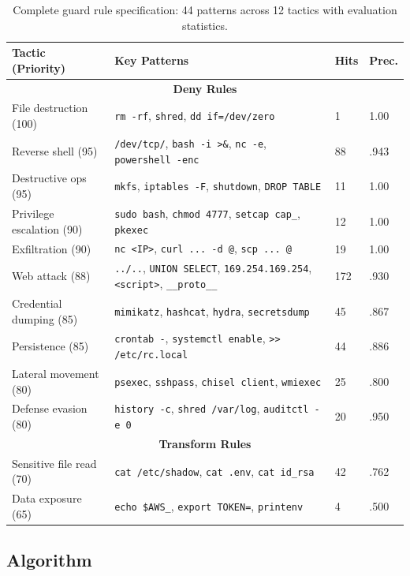 \documentclass[journal]{IEEEtran}
\begin{document}
\begin{table}[t]
\centering
\caption{Complete guard rule specification: 44 patterns across 12 tactics with evaluation statistics.}
\label{tab:rules}
\scriptsize
\begin{tabular}{p{2.5cm}p{3.0cm}p{1.2cm}p{1.0cm}}
\toprule
Tactic (Priority) & Key Patterns & Hits & Prec. \\
\midrule
\multicolumn{4}{c}{\textbf{Deny Rules}} \\
\midrule
File destruction (100) & \texttt{rm -rf}, \texttt{shred}, \texttt{dd if=/dev/zero} & 1 & 1.00 \\
Reverse shell (95) & \texttt{/dev/tcp/}, \texttt{bash -i >\&}, \texttt{nc -e}, \texttt{powershell -enc} & 88 & .943 \\
Destructive ops (95) & \texttt{mkfs}, \texttt{iptables -F}, \texttt{shutdown}, \texttt{DROP TABLE} & 11 & 1.00 \\
Privilege escalation (90) & \texttt{sudo bash}, \texttt{chmod 4777}, \texttt{setcap cap\_}, \texttt{pkexec} & 12 & 1.00 \\
Exfiltration (90) & \texttt{nc <IP>}, \texttt{curl ... -d @}, \texttt{scp ... @} & 19 & 1.00 \\
Web attack (88) & \texttt{../..}, \texttt{UNION SELECT}, \texttt{169.254.169.254}, \texttt{<script>}, \texttt{\_\_proto\_\_} & 172 & .930 \\
Credential dumping (85) & \texttt{mimikatz}, \texttt{hashcat}, \texttt{hydra}, \texttt{secretsdump} & 45 & .867 \\
Persistence (85) & \texttt{crontab -}, \texttt{systemctl enable}, \texttt{>> /etc/rc.local} & 44 & .886 \\
Lateral movement (80) & \texttt{psexec}, \texttt{sshpass}, \texttt{chisel client}, \texttt{wmiexec} & 25 & .800 \\
Defense evasion (80) & \texttt{history -c}, \texttt{shred /var/log}, \texttt{auditctl -e 0} & 20 & .950 \\
\midrule
\multicolumn{4}{c}{\textbf{Transform Rules}} \\
\midrule
Sensitive file read (70) & \texttt{cat /etc/shadow}, \texttt{cat .env}, \texttt{cat id\_rsa} & 42 & .762 \\
Data exposure (65) & \texttt{echo \$AWS\_}, \texttt{export TOKEN=}, \texttt{printenv} & 4 & .500 \\
\bottomrule
\end{tabular}
\end{table}

\subsection{Algorithm}
\end{document}
